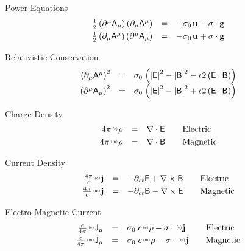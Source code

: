 \documentclass[aps,twocolumn,secnumarabic,nobalancelastpage,amsmath,amssymb,
amsthm,nofootinbib,parskip=full]{revtex4}
\numberwithin{equation}{section}
\newcommand{\abs}[1]{\left|#1\right|}
\newcommand{\iu}{\iota\mkern1mu}
\newcommand{\pauli}[1]{\sigma_#1\mkern2mu}
\newcommand{\qv}[1]{\mathbf{\mathsf{#1}}}
\newcommand{\ppv}[2]{{\,\raisebox{2pt}{\scalebox{.5}{(#1)\,}}}#2}
\newcommand{\qvl}[2]{\ppv{#1}{\mathbf{\mathsf{#2}}}}
\newcommand{\sv}[1]{\mathbf{#1}}
\newcommand{\svl}[2]{\ppv{#1}{\sv{#2}}}
\newcommand{\ssl}[2]{\ppv{#1}{#2}}
\begin{document}
Power Equations
\begin{equation*}
\begin{array}{rcl}
\frac{1}{2}\left(\partial^\mu\qv{A}_\mu\right)
  \left(\partial_\mu\qv{A}^\mu\right)&=&
              -\pauli{0}\mathbf{u}-\sigma\cdot\mathbf{g} \\[3pt]
\frac{1}{2}\left(\partial_\mu\qv{A}^\mu\right)
  \left(\partial^\mu\qv{A}_\mu\right)&=&
              -\pauli{0}\mathbf{u}+\sigma\cdot\mathbf{g}
\end{array}
\end{equation*}

Relativistic Conservation
\begin{equation*}
\begin{array}{rcl}
\left(\partial_\mu\qv{A}^\mu\right)^2&=&
                  \pauli{0}\left(\abs{\qv{E}}^2-\abs{\qv{B}}^2
                -\iu 2\left(\qv{E}\cdot\qv{B}\right)\right) \\[3pt]
\left(\partial^\mu\qv{A}_\mu\right)^2&=&
                  \pauli{0}\left(\abs{\qv{E}}^2-\abs{\qv{B}}^2
                 +\iu 2\left(\qv{E}\cdot\qv{B}\right)\right) \\[3pt]
\end{array}
\end{equation*}

Charge Density
\begin{equation*}
\begin{array}{rclll}
4\pi\ssl{e}{\rho}&=&\nabla\cdot\qv{E}&&\text{Electric} \\[3pt]
4\pi\ssl{m}{\rho}&=&\nabla\cdot\qv{B}&&\text{Magnetic}
\end{array}
\end{equation*}

Current Density
\begin{equation*}
\begin{array}{rclll}
\frac{4\pi}{c}\svl{e}{j}&=&
              -\partial_{ct}\qv{E}+\nabla\times\qv{B}&&\text{Electric} \\[3pt]
\frac{4\pi}{c}\svl{m}{j}&=&
               -\partial_{ct}\qv{B}-\nabla\times\qv{E}&&\text{Magnetic}
\end{array}
\end{equation*}

Electro-Magnetic Current
\begin{equation*}
\begin{array}{rclll}
\frac{c}{4\pi}\qvl{e}{J}_\mu&=&\pauli{0}\,c\ssl{e}{\rho}
                       -\sigma\cdot\svl{e}{j}&&\text{Electric} \\[3pt]
\frac{c}{4\pi}\qvl{m}{J}_\mu&=&\pauli{0}\,c\ssl{m}{\rho}
                       -\sigma\cdot\svl{m}{j}&&\text{Magnetic}
\end{array}
\end{equation*}
\end{document}
